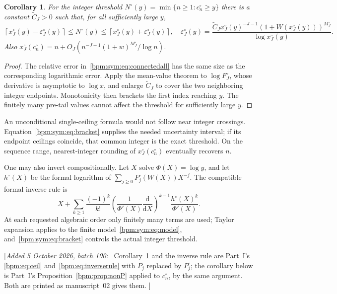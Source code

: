 \documentclass[11pt,a4paper]{article}
\newtheorem{corollary}[theorem]{Corollary}%
\theoremstyle{remark}\newtheorem{remark}[theorem]{Remark}%
\newenvironment{writenote}{\par\smallskip\noindent\small[\textit{Added 5 October 2026, batch 100:}\ }{]\par\smallskip}
\begin{document}
\begin{corollary}\label{bpm:sym:cor:inverse}
For the integer threshold $N^\circ(y)=\min\{n\ge1:c^\circ_n\ge y\}$ there is a constant $\widetilde C_J>0$ such that, for all sufficiently large $y$,
\begin{equation}\label{bpm:sym:eq:bracket}
 \left\lceil x^\circ_J(y)-\varepsilon^\circ_J(y)\right\rceil
 \le N^\circ(y)\le
 \left\lceil x^\circ_J(y)+\varepsilon^\circ_J(y)\right\rceil,
 \quad
 \varepsilon^\circ_J(y)=\frac{\widetilde C_J x^\circ_J(y)^{-J-1}(1+W(x^\circ_J(y)))^{M^\circ_J}}
 {\log x^\circ_J(y)}.
\end{equation}
Also $x^\circ_J(c^\circ_n)=n+O_J(n^{-J-1}(1+w)^{M^\circ_J}/\log n)$.
\end{corollary}
\begin{proof}
The relative error in~\eqref{bpm:sym:eq:connectedall} has the same size as the corresponding logarithmic error. Apply the mean-value theorem to $\log F^\circ_J$, whose derivative is asymptotic to $\log x$, and enlarge $\widetilde C_J$ to cover the two neighboring integer endpoints. Monotonicity then brackets the first index reaching $y$. The finitely many pre-tail values cannot affect the threshold for sufficiently large $y$.
\end{proof}
An unconditional single-ceiling formula would not follow near integer crossings. Equation~\eqref{bpm:sym:eq:bracket} supplies the needed uncertainty interval; if its endpoint ceilings coincide, that common integer is the exact threshold. On the sequence range, nearest-integer rounding of $x^\circ_J(c^\circ_n)$ eventually recovers $n$.

One may also invert compositionally. Let $X$ solve $\Phi(X)=\log y$, and let $h^\circ(X)$ be the formal logarithm of $\sum_{j\ge0}P^\circ_j(W(X))X^{-j}$. The compatible formal inverse rule is
\[
 X+\sum_{k\ge1}\frac{(-1)^k}{k!}
 \left(\frac1{\Phi'(X)}\frac{\mathrm d}{\mathrm dX}\right)^{k-1}
 \frac{h^\circ(X)^k}{\Phi'(X)}.
\]
At each requested algebraic order only finitely many terms are used; Taylor expansion applies to the finite model~\eqref{bpm:sym:eq:model}, and~\eqref{bpm:sym:eq:bracket} controls the actual integer threshold.

\begin{writenote}
Corollary~\ref{bpm:sym:cor:inverse} and the inverse rule are Part~I's
\eqref{bpm:eq:ceil} and~\eqref{bpm:eq:inverserule} with $P_j$ replaced by
$P^\circ_j$; the corollary below is Part~I's
Proposition~\ref{bpm:prop:nonP} applied to $c^\circ_n$, by the same
argument. Both are printed as manuscript~02 gives them.
\end{writenote}
\end{document}
